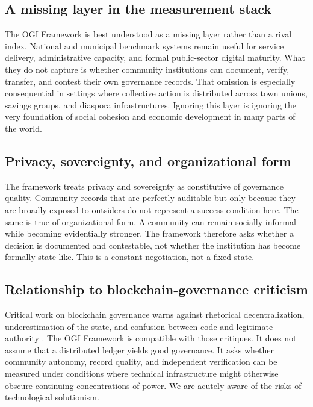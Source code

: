 \documentclass[sigconf,anonymous]{acmart}
\begin{document}
\subsection{A missing layer in the measurement stack}

The OGI Framework is best understood as a missing layer rather than a rival index. National and municipal benchmark systems remain useful for service delivery, administrative capacity, and formal public-sector digital maturity. What they do not capture is whether community institutions can document, verify, transfer, and contest their own governance records. That omission is especially consequential in settings where collective action is distributed across town unions, savings groups, and diaspora infrastructures. Ignoring this layer is ignoring the very foundation of social cohesion and economic development in many parts of the world.

\subsection{Privacy, sovereignty, and organizational form}

The framework treats privacy and sovereignty as constitutive of governance quality. Community records that are perfectly auditable but only because they are broadly exposed to outsiders do not represent a success condition here. The same is true of organizational form. A community can remain socially informal while becoming evidentially stronger. The framework therefore asks whether a decision is documented and contestable, not whether the institution has become formally state-like. This is a constant negotiation, not a fixed state.

\subsection{Relationship to blockchain-governance criticism}

Critical work on blockchain governance warns against rhetorical decentralization, underestimation of the state, and confusion between code and legitimate authority \cite{atzori2017, schneider2019}. The OGI Framework is compatible with those critiques. It does not assume that a distributed ledger yields good governance. It asks whether community autonomy, record quality, and independent verification can be measured under conditions where technical infrastructure might otherwise obscure continuing concentrations of power. We are acutely aware of the risks of technological solutionism.
\end{document}
